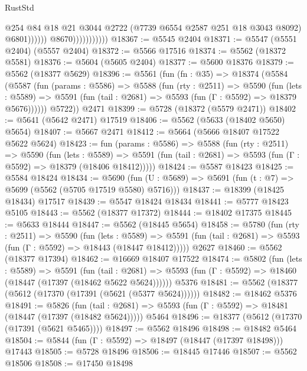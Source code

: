 \begin{lexlean}{RustStd}
\begin{coremodule}
                                      @254
                                      @84
                                      @18
                                      @21
                                      @3044
                                      @2722
                                      (@7739 @6554 @2587 @251 @18 @3043 @8092)
                                      @6801))))))
                          @8670)))))))))))
@18367 := @5545 @2404
@18371 := @5547 (@5551 @2404) (@5557 @2404)
@18372 := @5566 @17516
@18374 := @5562 (@18372 @5581)
@18376 := @5604 (@5605 @2404)
@18377 := @5600 @18376
@18379 := @5562 (@18377 @5629)
@18396 := @5561
    (fun (fn : @35) =>
    @18374
      (@5584
        (@5587
          (fun (params : @5586) =>
          @5588
            (fun (rty : @2511) =>
            @5590
              (fun (lets : @5589) =>
              @5591 (fun (tail : @2681) => @5593 (fun (Γ : @5592) => @18379 @5676))))))
        @5722))
    @2471
@18399 := @5728 (@18372 (@5579 @2471))
@18402 := @5641 (@5642 @2471) @17519
@18406 := @5562 (@5633 (@18402 @5650) @5654)
@18407 := @5667 @2471
@18412 := @5664 (@5666 @18407 @17522 @5622 @5624)
@18423 := fun (params : @5586) =>
  @5588
    (fun (rty : @2511) =>
    @5590
      (fun (lets : @5589) =>
      @5591 (fun (tail : @2681) => @5593 (fun (Γ : @5592) => @18379 (@18406 @18412)))))
@18424 := @5587 @18423
@18425 := @5584 @18424
@18434 := @5690
    (fun (U : @5689) => @5691 (fun (t : @7) => @5699 (@5562 (@5705 @17519 @5580) @5716)))
@18437 := @18399 (@18425 @18434) @17517
@18439 := @5547 @18424 @18434
@18441 := @5777 @18423 @5105
@18443 := @5562 (@18377 @17372)
@18444 := @18402 @17375
@18445 := @5633 @18444
@18447 := @5562 (@18445 @5654)
@18458 := @5780
    (fun (rty : @2511) =>
    @5590
      (fun (lets : @5589) =>
      @5591 (fun (tail : @2681) => @5593 (fun (Γ : @5592) => @18443 (@18447 @18412)))))
    @2627
@18460 := @5562 (@18377 @17394)
@18462 := @16669 @18407 @17522
@18474 := @5802
    (fun (lets : @5589) =>
    @5591
      (fun (tail : @2681) =>
      @5593 (fun (Γ : @5592) => @18460 (@18447 (@17397 (@18462 @5622 @5624))))))
    @5376
@18481 := @5562 (@18377 (@5612 (@17370 (@17391 (@5621 (@5377 @5624))))))
@18482 := @18462 @5376
@18491 := @5826
    (fun (tail : @2681) => @5593 (fun (Γ : @5592) => @18481 (@18447 (@17397 (@18482 @5624)))))
    @5464
@18496 := @18377 (@5612 (@17370 (@17391 (@5621 @5465))))
@18497 := @5562 @18496
@18498 := @18482 @5464
@18504 := @5844 (fun (Γ : @5592) => @18497 (@18447 (@17397 @18498))) @17443
@18505 := @5728 @18496
@18506 := @18445 @17446
@18507 := @5562 @18506
@18508 := @17450 @18498

\end{coremodule}
\end{lexlean}
